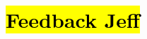 \documentclass[12pt]{article}
\begin{document}
\section*{\hl{Feedback Jeff}}
	\begin{coi}
%

\end{coi}
\end{document}
